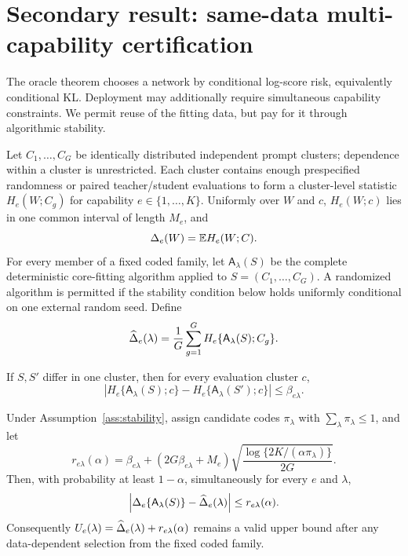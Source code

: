 \section{Secondary result: same-data multi-capability certification}
\label{sec:certification}

The oracle theorem chooses a network by conditional log-score risk, equivalently conditional KL\@. Deployment may additionally require simultaneous capability constraints. We permit reuse of the fitting data, but pay for it through algorithmic stability.

Let \(C_1,\ldots,C_G\) be identically distributed independent prompt clusters; dependence within a cluster is unrestricted. Each cluster contains enough prespecified randomness or paired teacher/student evaluations to form a cluster-level statistic
\(H_e(W;C_g)\) for capability \(e\in\{1,\ldots,K\}\).  Uniformly over \(W\) and \(c\), \(H_e(W;c)\) lies in one common interval of length \(M_e\), and
\[
\Delta_e(W)=\mathbb E H_e(W;C).
\]
For every member of a fixed coded family, let \(\mathsf A_\lambda(S)\) be the complete deterministic core-fitting algorithm applied to \(S=(C_1,\ldots,C_G)\). A randomized algorithm is permitted if the stability condition below holds uniformly conditional on one external random seed. Define
\[
\widehat\Delta_e(\lambda)=\frac1G\sum_{g=1}^G
H_e\{\mathsf A_\lambda(S);C_g\}.
\]

\begin{assumption}
\label{ass:stability}
If \(S,S'\) differ in one cluster, then for every evaluation cluster \(c\),
\[
\left|H_e\{\mathsf A_\lambda(S);c\}
-H_e\{\mathsf A_\lambda(S');c\}\right|
\le\beta_{e\lambda}.
\]
\end{assumption}

\begin{theorem}
\label{thm:certificate}
Under Assumption~\ref{ass:stability}, assign candidate codes \(\pi_\lambda\) with \(\sum_\lambda\pi_\lambda\le1\), and let
\begin{equation}
 r_{e\lambda}(\alpha)=
 \beta_{e\lambda}+
 (2G\beta_{e\lambda}+M_e)
 \sqrt{\frac{\log\{2K/(\alpha\pi_\lambda)\}}{2G}}.
 \label{eq:stability-radius}
\end{equation}
Then, with probability at least \(1-\alpha\), simultaneously for every \(e\) and \(\lambda\),
\begin{equation}
\left|\Delta_e\{\mathsf A_\lambda(S)\}
-\widehat\Delta_e(\lambda)\right|
\le r_{e\lambda}(\alpha).
\label{eq:sim-band}
\end{equation}
Consequently \(U_e(\lambda)=\widehat\Delta_e(\lambda)+r_{e\lambda}(\alpha)\) remains a valid upper bound after any data-dependent selection from the fixed coded family.
\end{theorem}

